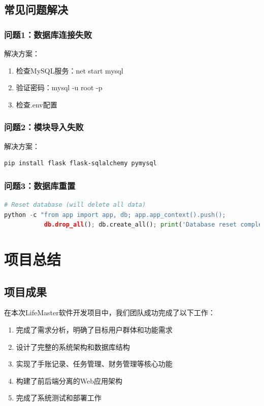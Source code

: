 \documentclass[a4paper]{article}
\begin{document}
\subsection{常见问题解决}

\subsubsection{问题1：数据库连接失败}

解决方案：
\begin{enumerate}
    \item 检查MySQL服务：net start mysql
    \item 验证密码：mysql -u root -p
    \item 检查.env配置
\end{enumerate}

\subsubsection{问题2：模块导入失败}

解决方案：
\begin{lstlisting}[language=bash]
pip install flask flask-sqlalchemy pymysql
\end{lstlisting}

\subsubsection{问题3：数据库重置}

\begin{lstlisting}[language=python]
# Reset database (will delete all data)
python -c "from app import app, db; app.app_context().push(); 
           db.drop_all(); db.create_all(); print('Database reset complete!')"
\end{lstlisting}

\section{项目总结}

\subsection{项目成果}

在本次LifeMaster软件开发项目中，我们团队成功完成了以下工作：

\begin{enumerate}
    \item 完成了需求分析，明确了目标用户群体和功能需求
    \item 设计了完整的系统架构和数据库结构
    \item 实现了手账记录、任务管理、财务管理等核心功能
    \item 构建了前后端分离的Web应用架构
    \item 完成了系统测试和部署工作
\end{enumerate}
\end{document}
